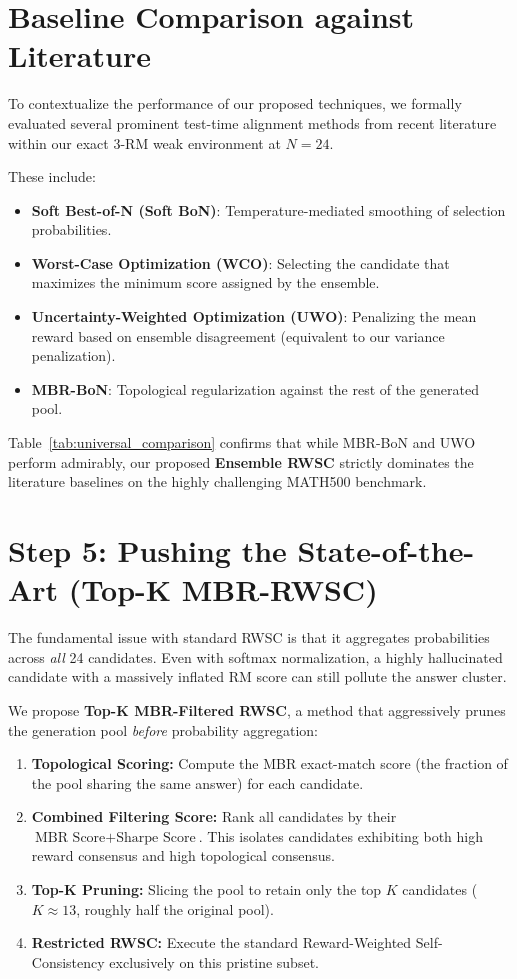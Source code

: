 \documentclass[a4paper,11pt]{article}
\begin{document}
\section{Baseline Comparison against Literature}
To contextualize the performance of our proposed techniques, we formally evaluated several prominent test-time alignment methods from recent literature within our exact 3-RM weak environment at $N=24$. 

These include:
\begin{itemize}
    \item \textbf{Soft Best-of-N (Soft BoN)}: Temperature-mediated smoothing of selection probabilities.
    \item \textbf{Worst-Case Optimization (WCO)}: Selecting the candidate that maximizes the minimum score assigned by the ensemble.
    \item \textbf{Uncertainty-Weighted Optimization (UWO)}: Penalizing the mean reward based on ensemble disagreement (equivalent to our variance penalization).
    \item \textbf{MBR-BoN}: Topological regularization against the rest of the generated pool.
\end{itemize}

Table~\ref{tab:universal_comparison} confirms that while MBR-BoN and UWO perform admirably, our proposed \textbf{Ensemble RWSC} strictly dominates the literature baselines on the highly challenging MATH500 benchmark.

\section{Step 5: Pushing the State-of-the-Art (Top-K MBR-RWSC)}
\label{sec:topk}
The fundamental issue with standard RWSC is that it aggregates probabilities across \emph{all} 24 candidates. Even with softmax normalization, a highly hallucinated candidate with a massively inflated RM score can still pollute the answer cluster.

We propose \textbf{Top-K MBR-Filtered RWSC}, a method that aggressively prunes the generation pool \emph{before} probability aggregation:
\begin{enumerate}
    \item \textbf{Topological Scoring:} Compute the MBR exact-match score (the fraction of the pool sharing the same answer) for each candidate.
    \item \textbf{Combined Filtering Score:} Rank all candidates by their $\text{MBR Score} + \text{Sharpe Score}$. This isolates candidates exhibiting both high reward consensus and high topological consensus.
    \item \textbf{Top-K Pruning:} Slicing the pool to retain only the top $K$ candidates ($K \approx 13$, roughly half the original pool).
    \item \textbf{Restricted RWSC:} Execute the standard Reward-Weighted Self-Consistency exclusively on this pristine subset.
\end{enumerate}
\end{document}
